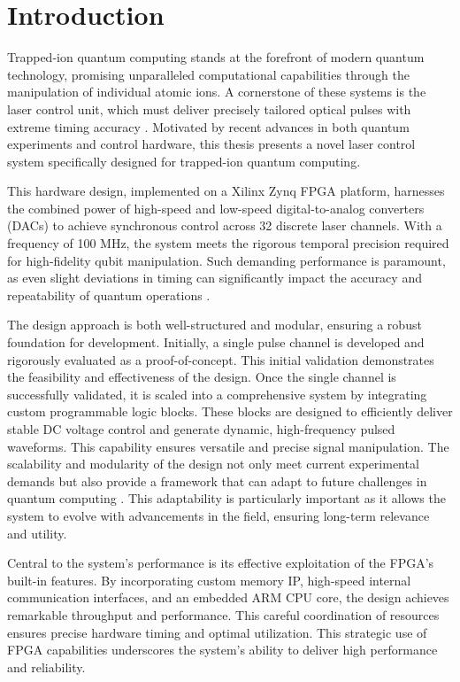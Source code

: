 \chapter{Introduction}

Trapped-ion quantum computing stands at the forefront of modern quantum technology, promising unparalleled computational capabilities through the manipulation of individual atomic ions. A cornerstone of these systems is the laser control unit, which must deliver precisely tailored optical pulses with extreme timing accuracy \cite{manychanfpgactrlsys}. Motivated by recent advances in both quantum experiments and control hardware, this thesis presents a novel laser control system specifically designed for trapped-ion quantum computing.

This hardware design, implemented on a Xilinx Zynq FPGA platform, harnesses the combined power of high-speed and low-speed digital-to-analog converters (DACs) to achieve synchronous control across 32 discrete laser channels. With a frequency of 100 MHz, the system meets the rigorous temporal precision required for high-fidelity qubit manipulation. Such demanding performance is paramount, as even slight deviations in timing can significantly impact the accuracy and repeatability of quantum operations \cite{manychanfpgactrlsys}.

The design approach is both well-structured and modular, ensuring a robust foundation for development. Initially, a single pulse channel is developed and rigorously evaluated as a proof-of-concept. This initial validation demonstrates the feasibility and effectiveness of the design. Once the single channel is successfully validated, it is scaled into a comprehensive system by integrating custom programmable logic blocks. These blocks are designed to efficiently deliver stable DC voltage control and generate dynamic, high-frequency pulsed waveforms. This capability ensures versatile and precise signal manipulation. The scalability and modularity of the design not only meet current experimental demands but also provide a framework that can adapt to future challenges in quantum computing \cite{programmablesoc4ctrlexperiment}. This adaptability is particularly important as it allows the system to evolve with advancements in the field, ensuring long-term relevance and utility.

Central to the system's performance is its effective exploitation of the FPGA's built-in features. By incorporating custom memory IP, high-speed internal communication interfaces, and an embedded ARM CPU core, the design achieves remarkable throughput and performance. This careful coordination of resources ensures precise hardware timing and optimal utilization. This strategic use of FPGA capabilities underscores the system's ability to deliver high performance and reliability.